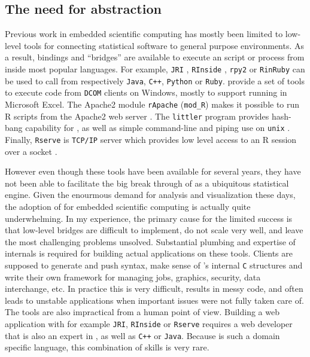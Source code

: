 \subsection{The need for abstraction}

Previous work in embedded scientific computing has mostly been limited to low-level tools for connecting statistical software to general purpose environments. As a result, bindings and ``bridges'' are available to execute an \R script or process from inside most popular languages. For example, \texttt{JRI} \citep{rjava}, \texttt{RInside} \citep{eddelbuettel2011rcpp}, \texttt{rpy2} \citep{gautier2008rpy2} or \texttt{RinRuby} \citep{dahl2008rinruby} can be used to call \R from respectively \texttt{Java}, \texttt{C++}, \texttt{Python} or \texttt{Ruby}. \cite{heiberger2009r} provide a set of tools to execute \R code from \texttt{DCOM} clients on Windows, mostly to support running \R in Microsoft Excel. The Apache2 module \texttt{rApache} (\texttt{mod\_R}) makes it possible to run R scripts from the Apache2 web server \citep{horner2013rapache}. The \texttt{littler} program provides hash-bang capability for \R, as well as simple command-line and piping use on \texttt{unix} \citep{littler}. Finally, \texttt{Rserve} is \texttt{TCP/IP} server which provides low level access to an R session over a socket \citep{urbanek2013rserve}. 

However even though these tools have been available for several years, they have not been able to facilitate the big break through of \R as a ubiquitous statistical engine. Given the enourmous demand for analysis and visualization these days, the adoption of \R for embedded scientific computing is actually quite underwhelming. In my experience, the primary cause for the limited success is that low-level bridges are difficult to implement, do not scale very well, and leave the most challenging problems unsolved. Substantial plumbing and expertise of \R internals is required for building actual applications on these tools. Clients are supposed to generate and push \R syntax, make sense of \R's internal \texttt{C} structures and write their own framework for managing jobs, graphics, security, data interchange, etc. In practice this is very difficult, results in messy code, and often leads to unstable applications when important issues were not fully taken care of. The tools are also impractical from a human point of view. Building a web application with for example \texttt{JRI}, \texttt{RInside} or \texttt{Rserve} requires a web developer that is also an expert in \R, as well as \texttt{C++} or \texttt{Java}. Because \R is such a domain specific language, this combination of skills is very rare. 

